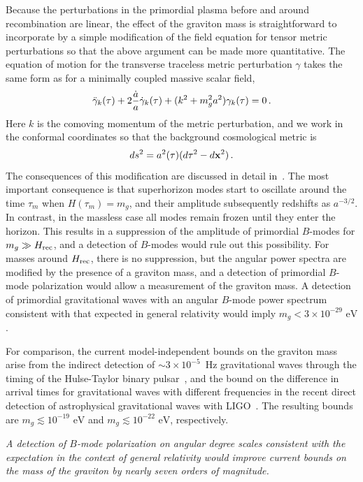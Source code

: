 Because the perturbations in the primordial plasma before and around recombination are linear, the effect of the graviton mass is straightforward to incorporate by a simple modification of the field equation for tensor metric perturbations so that the above argument can be made more quantitative. The equation of motion for the transverse traceless metric perturbation $\gamma$ takes the same form as for a minimally coupled massive scalar field,
\begin{equation}
\label{massive}
\ddot{\gamma}_k(\tau)+2{\dot a\over a} \dot{\gamma}_k(\tau)+(k^2+m_g^2 a^2) \gamma_k(\tau)=0\,.
\end{equation}
Here $k$ is the comoving momentum of the metric perturbation, and we work in the conformal coordinates so that the background cosmological metric is
\begin{equation}
ds^2= a^2(\tau)(d\tau^2-d{\bf x}^2)\,.
\end{equation}
The consequences of this modification are discussed in detail in~\cite{Dubovsky:2009xk}. The most important consequence is that superhorizon modes start to oscillate around the time $\tau_m$ when $H(\tau_m)=m_g$, and their amplitude subsequently redshifts as $a^{-3/2}$. In contrast, in the massless case all modes remain frozen until they enter the horizon. This results in a suppression of the amplitude of primordial $B$-modes for $m_g\gg H_{\rm rec}$, and a detection of $B$-modes would rule out this possibility. For masses around $H_{\rm rec}$, there is no suppression, but the angular power spectra are modified by the presence of a graviton mass, and a detection of primordial $B$-mode polarization would allow a measurement of the graviton mass. A detection of primordial gravitational waves with an angular $B$-mode power spectrum consistent with that expected in general relativity would imply $m_g< 3\times 10^{-29}{\mbox{ eV}}$.
 
For comparison, the current model-independent bounds on the graviton mass arise from the indirect detection of $\sim 3\times 10^{-5}$~Hz gravitational waves through the timing of the Hulse-Taylor binary pulsar~\cite{PhysRevD.65.044022}, and the bound on the difference in arrival times for gravitational waves with different frequencies in the recent direct detection of astrophysical gravitational waves with LIGO~\cite{PhysRevLett.116.061102}. The resulting bounds are $m_g\lesssim 10^{-19}{\mbox{ eV}}$ and $m_g\lesssim 10^{-22}{\mbox{ eV}}$, respectively. 

{\it A detection of $B$-mode polarization on angular degree scales consistent with the expectation in the context of general relativity would improve current bounds on the mass of the graviton by nearly seven orders of magnitude.} 

